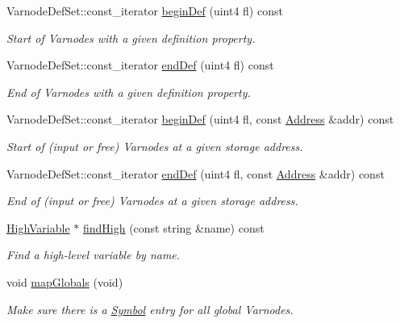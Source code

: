 \begin{DoxyCompactItemize}
Varnode\+Def\+Set\+::const\+\_\+iterator \mbox{\hyperlink{class_funcdata_a721c960a75b9ac5652a620b6195e33f5}{begin\+Def}} (uint4 fl) const
\begin{DoxyCompactList}\small\item\em Start of Varnodes with a given definition property. \end{DoxyCompactList}\item 
Varnode\+Def\+Set\+::const\+\_\+iterator \mbox{\hyperlink{class_funcdata_a5fa192d156e74fef2a22c274b86f3e73}{end\+Def}} (uint4 fl) const
\begin{DoxyCompactList}\small\item\em End of Varnodes with a given definition property. \end{DoxyCompactList}\item 
Varnode\+Def\+Set\+::const\+\_\+iterator \mbox{\hyperlink{class_funcdata_a52feb85441fe82ca75ec8334244d0426}{begin\+Def}} (uint4 fl, const \mbox{\hyperlink{class_address}{Address}} \&addr) const
\begin{DoxyCompactList}\small\item\em Start of (input or free) Varnodes at a given storage address. \end{DoxyCompactList}\item 
Varnode\+Def\+Set\+::const\+\_\+iterator \mbox{\hyperlink{class_funcdata_ab112eb1f47f8e32c0018c7af989f519c}{end\+Def}} (uint4 fl, const \mbox{\hyperlink{class_address}{Address}} \&addr) const
\begin{DoxyCompactList}\small\item\em End of (input or free) Varnodes at a given storage address. \end{DoxyCompactList}\item 
\mbox{\hyperlink{class_high_variable}{High\+Variable}} $\ast$ \mbox{\hyperlink{class_funcdata_aa34c7b2d0d5f4cb28e0a2602d3cba033}{find\+High}} (const string \&name) const
\begin{DoxyCompactList}\small\item\em Find a high-\/level variable by name. \end{DoxyCompactList}\item 
void \mbox{\hyperlink{class_funcdata_aed6aefa7321e887e3b759de94e4d3d4f}{map\+Globals}} (void)
\begin{DoxyCompactList}\small\item\em Make sure there is a \mbox{\hyperlink{class_symbol}{Symbol}} entry for all global Varnodes. \end{DoxyCompactList}\item 

\end{DoxyCompactItemize}
